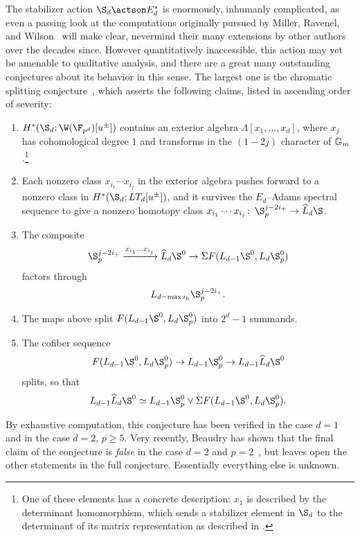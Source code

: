 The stabilizer action \(\S_d \actson E_d^*\) is enormously, inhumanly complicated, as even a passing look at the computations originally pursued by Miller, Ravenel, and Wilson~\cite{MRW} will make clear, nevermind their many extensions by other authors over the decades since.  However quantitatively inaccessible, this action may yet be amenable to qualitative analysis, and there are a great many outstanding conjectures about its behavior in this sense.  The largest one is the chromatic splitting conjecture~\cite[Conjecture 4.2]{HoveyCSC}, which asserts the following claims, listed in ascending order of severity:
\begin{enumerate}
    \item \(H^*(\S_d; \W(\F_{p^d})[u^\pm])\) contains an exterior algebra \(\Lambda[x_1, \ldots, x_d]\), where \(x_j\) has cohomological degree \(1\) and transforms in the \((1 - 2j)\){\th} character of \(\mathbb G_m\).\footnote{One of these elements has a concrete description: \(x_1\) is described by the determinant homomorphism, which sends a stabilizer element in \(\S_d\) to the determinant of its matrix representation as described in .}
    \item Each nonzero class \(x_{i_1} \cdots x_{i_j}\) in the exterior algebra pushes forward to a nonzero class in \(H^*(\S_d; LT_d[u^\pm])\), and it survives the \(E_d\)--Adams spectral sequence to give a nonzero homotopy class \(x_{i_1} \cdots x_{i_j}\co \S_p^{j-2i_+} \to \widehat L_d \S\).
    \item The composite \[\S_p^{j-2i_+} \xrightarrow{x_{i_1} \ldots x_{i_j}} \widehat L_d \S^0 \to \Susp F(L_{d-1} \S^0, L_d \S_p^0)\] factors through \[L_{d - \max i_k} \S_p^{j-2i_+}.\]
    \item The maps above split \(F(L_{d-1} \S^0, L_d \S^0_p)\) into \(2^d-1\) summands.
    \item The cofiber sequence \[F(L_{d-1} \S^0, L_d \S^0_p) \to L_{d-1} \S^0_p \to L_{d-1} \widehat L_d \S^0\] splits, so that \[L_{d-1} \widehat L_d \S^0 \simeq L_{d-1} \S^0_p \vee \Susp F(L_{d-1} \S^0, L_d \S^0_p).\]
\end{enumerate}
By exhaustive computation, this conjecture has been verified in the case \(d = 1\) and in the case \(d = 2\), \(p \ge 5\).  Very recently, Beaudry has shown that the final claim of the conjecture is \emph{false} in the case \(d = 2\) and \(p = 2\)~\cite{Beaudry}, but leaves open the other statements in the full conjecture.  Essentially everything else is unknown.

